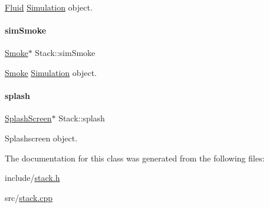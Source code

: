 \mbox{\hyperlink{classFluid}{Fluid}} \mbox{\hyperlink{classSimulation}{Simulation}} object. 

\mbox{\label{classStack_a0eb428edacee758da17e9b8a8943db79}} 
\paragraph{\texorpdfstring{simSmoke}{simSmoke}}
{\footnotesize\ttfamily \mbox{\hyperlink{classSmoke}{Smoke}}$\ast$ Stack\+::sim\+Smoke\hspace{0.3cm}{\ttfamily [private]}}



\mbox{\hyperlink{classSmoke}{Smoke}} \mbox{\hyperlink{classSimulation}{Simulation}} object. 

\mbox{\label{classStack_a2d3f7bf6df4a15c81ed677fd728dda4c}} 
\paragraph{\texorpdfstring{splash}{splash}}
{\footnotesize\ttfamily \mbox{\hyperlink{classSplashScreen}{Splash\+Screen}}$\ast$ Stack\+::splash\hspace{0.3cm}{\ttfamily [private]}}



Splashscreen object. 



The documentation for this class was generated from the following files\+:\begin{DoxyCompactItemize}
\item 
include/\mbox{\hyperlink{stack_8h}{stack.\+h}}\item 
src/\mbox{\hyperlink{stack_8cpp}{stack.\+cpp}}\end{DoxyCompactItemize}
